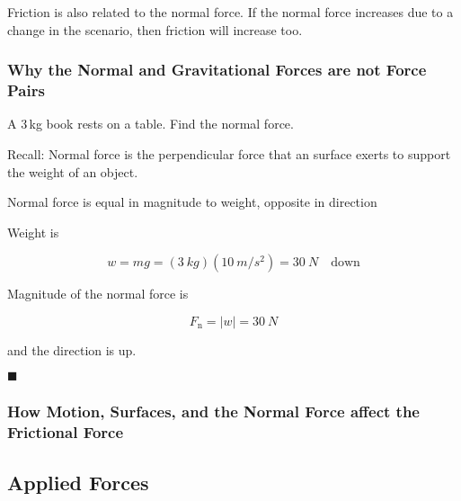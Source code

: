 \documentclass[dvipsnames]{article}
\begin{document}
Friction is also related to the normal force. If the normal force increases due to a change in the scenario, then friction will increase too. 

\subsubsection{Why the Normal and Gravitational Forces are not Force Pairs}

\begin{example}
A 3\,kg book rests on a table. Find the normal force.
\end{example}

\begin{center}
\end{center}

Recall: Normal force is the perpendicular force that an surface exerts to support the weight of an object. 

Normal force is equal in magnitude to weight, opposite in direction

Weight is

\begin{equation*}
    w = mg = (\SI{3}{kg})(\SI{10}{m/s^2}) = \SI{30}{N} \quad \text{down}
\end{equation*}

Magnitude of the normal force is

\begin{equation}
    F_\mathrm{n} = \left|w\right| = \SI{30}{N}
\end{equation}

and the direction is up.

\hfill $\blacksquare$

\subsubsection{How Motion, Surfaces, and the Normal Force affect the Frictional Force}

\subsection{Applied Forces}
\end{document}
